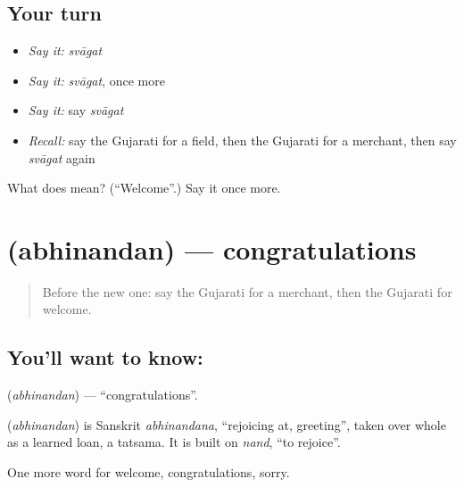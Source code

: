 \subsection*{Your turn}
\begin{itemize}
\raggedright
  \item \emph{Say it:} \emph{svāgat}
  \item \emph{Say it:} \emph{svāgat}, once more
  \item \emph{Say it:} say \emph{svāgat}
  \item \emph{Recall:} say the Gujarati for a field, then the Gujarati for a merchant, then say \emph{svāgat} again
\end{itemize}

\begin{tcolorbox}[breakable,colback=teal!4,colframe=teal!35!black,title={Before you move on}]
What does  mean? (\textquotedblleft{}Welcome\textquotedblright{}.) Say it once more.
\end{tcolorbox}
\section[\texorpdfstring{\gu{અભિનંદન} (abhinandan)}{અભિનંદન (abhinandan)}]{ (abhinandan) — congratulations}

\label{lesson:GU-C91-congratulations}



\begin{quote}
Before the new one: say the Gujarati for a merchant, then the Gujarati for welcome.
\end{quote}

\subsection*{You'll want to know: }
\textbf{} (\emph{abhinandan}) — \textquotedblleft{}congratulations\textquotedblright{}.

\begin{cousinweb}
\textbf{} (\emph{abhinandan}) is Sanskrit \emph{abhinandana}, \textquotedblleft{}rejoicing at, greeting\textquotedblright{}, taken over whole as a learned loan, a tatsama. It is built on \emph{nand}, \textquotedblleft{}to rejoice\textquotedblright{}.
\end{cousinweb}

\begin{grammarlens}[title={What you've built}]
One more word for welcome, congratulations, sorry.
\end{grammarlens}

